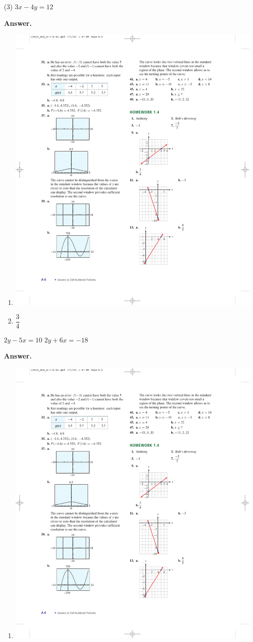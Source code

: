 \documentclass[10pt,]{book}
\theoremstyle{plain}
\theoremstyle{definition}
\theoremstyle{definition}
\theoremstyle{definition}
\theoremstyle{definition}
\numberwithin{equation}{part}
\begin{document}
\begin{exercisegroup}(3)
\exercise[9.]\hypertarget{exercise-224}{}\(3x - 4y = 12\)%
\par\smallskip
\noindent\textbf{Answer.}\hypertarget{answer-130}{}\quad
\leavevmode%
\begin{enumerate}[label=*\alph**]
\item\hypertarget{li-935}{}\includegraphics[width=0.6\linewidth]{images/fig-ans-1-4-9}
%
\item\hypertarget{li-936}{}\(\dfrac{3}{4} \)%
\end{enumerate}
%
\exercise[10.]\hypertarget{exercise-225}{}\(2y - 5x = 10\)%
\exercise[11.]\hypertarget{exercise-226}{}\(2y + 6x = -18\)%
\par\smallskip
\noindent\textbf{Answer.}\hypertarget{answer-131}{}\quad
\leavevmode%
\begin{enumerate}[label=*\alph**]
\item\hypertarget{li-937}{}\includegraphics[width=0.6\linewidth]{images/fig-ans-1-4-11}

\end{enumerate}
\end{exercisegroup}
\end{document}
